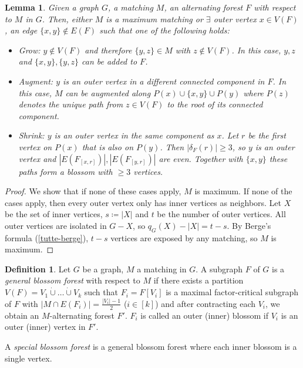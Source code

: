 \documentclass[11pt, a4paper]{article}
\newcommand{\abs}[1]{\left\lvert#1\right\rvert}
\newcommand{\set}[1]{\{#1\}}
\newtheorem{lemma}[theorem]{Lemma}
\theoremstyle{remark}
\theoremstyle{definition}
\newtheorem{definition}[theorem]{Definition}
\begin{document}
\begin{lemma}
	Given a graph $G$, a matching $M$, an alternating forest $F$ with respect
	to $M$ in $G$. Then, either $M$ is a maximum matching or $\exists$
	outer vertex $x\in V(F)$, an edge $\set{x,y}\notin E(F)$ such that one
	of the following holds:
	\begin{itemize}
		\item Grow: $y\notin V(F)$ and therefore $\set{y,z}\in M$ with $z\notin
			V(F)$. In this case, $y,z$ and $\set{x,y},\set{y,z}$ can be added to
		$F$.

		\item Augment: $y$ is an outer vertex in a different connected component in
		$F$. In this case, $M$ can be augmented along $P(x)\cup\set{x,y} \cup
			P(y)$ where $P(z)$ denotes the unique path from $z\in V(F)$ to the
		root of its connected component.

		\item Shrink: $y$ is an outer vertex in the same component as $x$. Let $r$
		be the first vertex on $P(x)$ that is also on $P(y)$. Then
		$\abs{\delta_F(r)}\geq 3$, so $y$ is an outer vertex and
		$\abs{E(F_{[x,r]})},\abs{E(F_{[y,r]})}$ are even. Together with
		$\set{x,y}$ these paths form a blossom with $\geq 3$ vertices.
	\end{itemize}
\end{lemma}
\begin{proof}
	We show that if none of these cases apply, $M$ is maximum.
	If none of the cases apply, then every outer vertex only has inner vertices as neighbors.
	Let $X$ be
	the set of inner vertices, $s\coloneqq\abs{X}$ and $t$ be the number
	of outer vertices. All outer vertices are isolated in $G-X$, so
	$q_G(X)-\abs{X}=t-s$. By Berge's formula (\ref{tutte-berge}), $t-s$
	vertices are exposed by any matching, so $M$ is maximum.
\end{proof}

\begin{definition}\label{def:special-blossom-forest}
	Let $G$ be a graph, $M$ a matching in $G$. A subgraph $F$ of $G$ is a
	\emph{general blossom forest} with respect to $M$ if there exists a
	partition $V(F)=V_1\dot\cup\ldots\dot\cup V_k$ such that $F_i=F[V_i]$
	is a maximal factor-critical subgraph of $F$ with $\abs{M\cap E(F_i)}
		=\frac{\abs{V_i}-1}{2}$ ($i\in [k]$) and after contracting each $V_i$,
	we obtain an $M$-alternating forest $F'$.
	$F_i$ is called an outer (inner) blossom if $V_i$ is an outer (inner)
	vertex in $F'$.

	A \emph{special blossom forest} is a general blossom forest where
	each inner blossom is a single vertex.
\end{definition}
\end{document}
